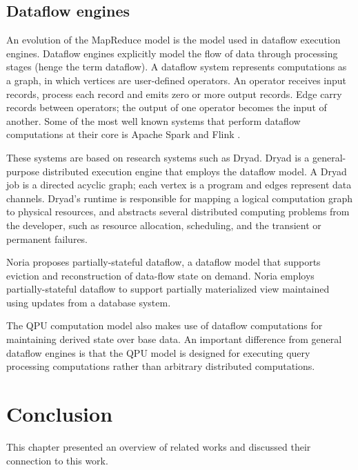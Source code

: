 \subsection{Dataflow engines}
An evolution of the MapReduce model is the model used in dataflow execution engines.
Dataflow engines explicitly model the flow of data through processing stages (henge the term dataflow).
A dataflow system represents computations as a graph, in which vertices are user-defined operators.
An operator receives input records, process each record and emits zero or more output records.
Edge carry records between operators; the output of one operator becomes the input of another.
Some of the most well known systems that perform dataflow computations at their core is
Apache Spark \cite{zaharia:spark} and Flink \cite{carbone:flink}.

These systems are based on research systems such as Dryad.
Dryad \cite{isard:dryad} is a general-purpose distributed execution engine that employs the dataflow model.
A Dryad job is a directed acyclic graph; each vertex is a program and edges represent data channels.
Dryad's runtime is responsible for mapping a logical computation graph to physical resources,
and abstracts several distributed computing problems from the developer,
such as resource allocation, scheduling, and the transient or permanent failures.

Noria \cite{gjengset:noria} proposes partially-stateful dataflow,
a dataflow model that supports eviction and reconstruction of data-flow state on demand.
Noria employs partially-stateful dataflow to support partially materialized view maintained
using updates from a database system.

The QPU computation model also makes use of dataflow computations for maintaining derived state
over base data.
An important difference from general dataflow engines is that the QPU model is designed for executing
query processing computations rather than arbitrary distributed computations.

\section{Conclusion}
This chapter presented an overview of related works and discussed their connection to this work.